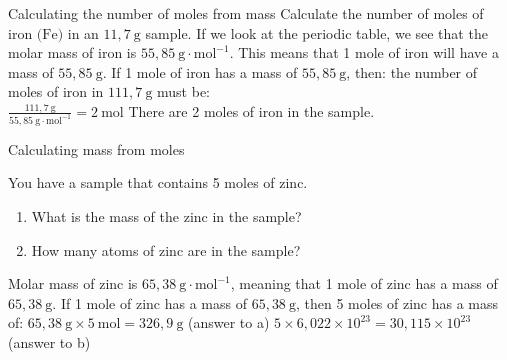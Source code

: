       \begin{wex}{Calculating the number of moles from mass }{
      \label{m38717*id276776}Calculate the number of moles of iron $\text{(Fe)}$ in an $11,7 ~\text{g}$ sample.  }
{
      \label{m38717*id276821}If we look at the periodic table, we see that the molar mass of iron is $55,85 ~\text{g} \cdot \text{mol}^{-1}$. This means that 1 mole of iron will have a mass of $55,85 ~\text{g}$.
      \label{m38717*id276848}If 1 mole of iron has a mass of $55,85 ~\text{g}$, then: the number of moles of iron in $111,7 ~\text{g}$ must be: \\
$\frac{111,7 ~\text{g}}{55,85 ~\text{g} \cdot{\text{mol}}^{-1}}=2 ~\text{mol}$
      \label{m38717*id276911}There are 2 moles of iron in the sample. 
}
    \end{wex}
\vspace{-2cm}
      \begin{wex}{Calculating mass from moles }{
      \label{m38717*id276928}You have a sample that contains 5 moles of zinc.
      \label{m38717*id276934}\begin{enumerate}[noitemsep, label=\textbf{\alph*}. ] 
            \label{m38717*uid12}\item What is the mass of the zinc in the sample?
\label{m38717*uid13}\item How many atoms of zinc are in the sample?
\end{enumerate}
      \vspace{5pt} }
{
      \label{m38717*id276984}Molar mass of zinc is $65,38 ~\text{g} \cdot \text{mol}^{-1}$, meaning that 1 mole of zinc has a mass of $65,38 ~\text{g}$.
      \label{m38717*id277021}If 1 mole of zinc has a mass of $65,38 ~\text{g}$, then 5 moles of zinc has a mass of: $65,38 ~\text{g} \times 5 ~\text{mol}=326,9 ~\text{g}$ (answer to a) 
$5 \times 6,022 \times {10}^{23} = 30,115 \times {10}^{23}$
      \label{m38717*id277263}(answer to b)
}
    \end{wex}
    \noindent \vspace{-1cm}
\label{m38717*secfhsst!!!underscore!!!id305}
